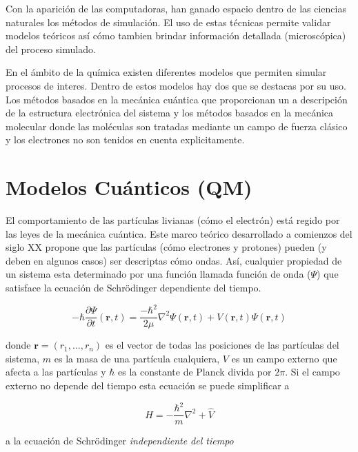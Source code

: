 Con la aparici\'on de las computadoras, han ganado espacio dentro de las ciencias naturales los m\'etodos de simulaci\'on.
El uso de estas t\'ecnicas permite validar modelos te\'oricos as\'i c\'omo tambien brindar informaci\'on detallada (microsc\'opica) del proceso simulado.

En el \'ambito de la qu\'imica existen diferentes modelos que permiten simular procesos de interes.
Dentro de estos modelos hay dos que se destacas por su uso.
Los m\'etodos basados en la mec\'anica cu\'antica que proporcionan un a descripci\'on de la estructura electr\'onica del sistema y los m\'etodos basados en la mec\'anica molecular donde las mol\'eculas son tratadas mediante un campo de fuerza
cl\'asico y los electrones no son tenidos en cuenta explicitamente.

\section{Modelos Cu\'anticos (QM)}

El comportamiento de las part\'iculas livianas (c\'omo el electr\'on) est\'a regido por las leyes de la mec\'anica cu\'antica.
Este marco te\'orico desarrollado a comienzos del siglo XX propone que las part\'iculas (c\'omo electrones y protones) pueden (y deben en algunos casos)
ser descriptas c\'omo ondas. As\'i, cualquier propiedad de un sistema esta determinado por una funci\'on llamada funci\'on de onda ($\Psi$) que satisface la ecuaci\'on de Schr\"{o}dinger dependiente del tiempo.

\begin{equation}
    \label{schro_time_dep}
    -\hbar\frac{\partial \Psi}{\partial t} (\mathbf{r},t) = \frac{-\hbar^2}{2\mu}\nabla^2 \Psi(\mathbf{r},t) + V(\mathbf{r},t) \Psi(\mathbf{r},t)
\end{equation}

donde $\mathbf{r} = (r_1,\dots,r_n)$ es el vector de todas las posiciones de las part\'iculas del sistema,
$m$ es la masa de una part\'icula cualquiera, $V$ es un campo externo que afecta a las part\'iculas y
$\hbar$ es la constante de Planck divida por $2\pi$. Si el campo externo no depende del tiempo esta ecuaci\'on se puede simplificar a

\begin{equation*}
    \hat{H} =  -\frac{\hbar^2}{m} \nabla^2 + \hat{V}
\end{equation*}

a la ecuaci\'on de Schr\"{o}dinger \textit{independiente del tiempo}

